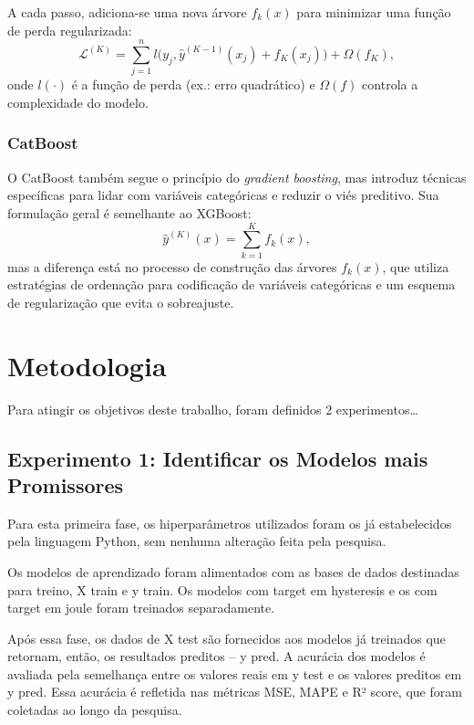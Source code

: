 \documentclass{article}
\begin{document}
A cada passo, adiciona-se uma nova árvore $f_k(x)$ para minimizar uma função de perda regularizada:
\[
\mathcal{L}^{(K)} = \sum_{j=1}^n l\big(y_j, \hat{y}^{(K-1)}(x_j) + f_K(x_j)\big) + \Omega(f_K),
\]
onde $l(\cdot)$ é a função de perda (ex.: erro quadrático) e $\Omega(f)$ controla a complexidade do modelo.



\subsubsection{CatBoost}

O CatBoost também segue o princípio do \textit{gradient boosting}, mas introduz técnicas específicas para lidar com variáveis categóricas e reduzir o viés preditivo. Sua formulação geral é semelhante ao XGBoost:
\[
\hat{y}^{(K)}(x) = \sum_{k=1}^K f_k(x),
\]
mas a diferença está no processo de construção das árvores $f_k(x)$, que utiliza estratégias de ordenação para codificação de variáveis categóricas e um esquema de regularização que evita o sobreajuste.


\newpage


\section{Metodologia}

Para atingir os objetivos deste trabalho, foram definidos 2 experimentos\dots

\subsection{Experimento 1: Identificar os Modelos mais Promissores}

Para esta primeira fase, os hiperparâmetros utilizados foram os já estabelecidos pela linguagem Python, sem nenhuma alteração feita pela pesquisa.

Os modelos de aprendizado foram alimentados com as bases de dados destinadas para treino, X train e y train. Os modelos com target em hysteresis e os com target em joule foram treinados separadamente.

Após essa fase, os dados de X test são fornecidos aos modelos já treinados que retornam, então, os resultados preditos \--- y pred. A acurácia dos modelos é avaliada pela semelhança entre os valores reais em y test e os valores preditos em y pred. Essa acurácia é refletida nas métricas MSE, MAPE e R² score, que foram coletadas ao longo da pesquisa.
\end{document}
